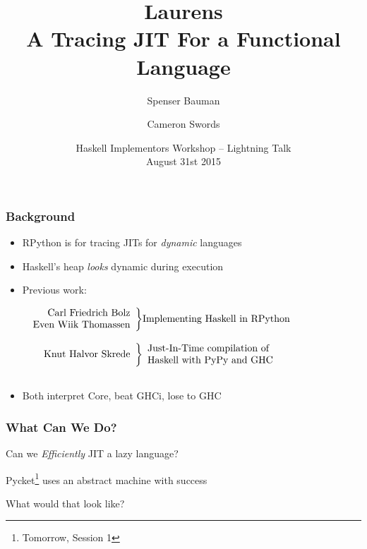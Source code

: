 \documentclass[xetex,serif,mathserif]{beamer}
\title{Laurens \\ {\normalsize A Tracing JIT For a Functional Language} }
\author[shortname]{Spenser Bauman \and Cameron Swords}
\institute[shortinst]{
    Indiana University Bloomington, USA
}
\date{Haskell Implementors Workshop -- Lightning Talk\\ August 31st 2015}
\newenvironment{slide}[1]{\begin{frame}\frametitle{#1}}{\end{frame}}
\begin{document}
\frame{\titlepage}

\begin{slide}{Background}
  \begin{itemize}
    \item RPython is for tracing JITs for \emph{dynamic} languages
    \item Haskell's heap \emph{looks} dynamic during execution
    \item Previous work:

            \vspace*{1em}
            $\begin{array}{r@{}c@{}l}\begin{array}{r}
            \text{Carl Friedrich Bolz} \\
            \text{Even Wiik Thomassen}\\
            \end{array} & \biggr\}  & \text{Implementing Haskell in RPython}\\\\
            \begin{array}{r}\text{Knut Halvor Skrede}\end{array} & \biggr\} & 
            \begin{array}{l@{}}
            \text{Just-In-Time compilation of}\\
            \text{Haskell with PyPy and GHC}
            \end{array}\\\\
            \end{array}$

    \item Both interpret Core, beat GHCi, lose to GHC
  \end{itemize}
\end{slide}

\begin{slide}{What Can We Do?}

  \begin{center}
  Can we \emph{Efficiently} JIT a lazy language?

  \vspace{3em}

  Pycket\footnote{Tomorrow, Session 1} uses an abstract machine with success

  \vspace{3em}

  What would that look like?
  \end{center}
\end{slide}
\end{document}
